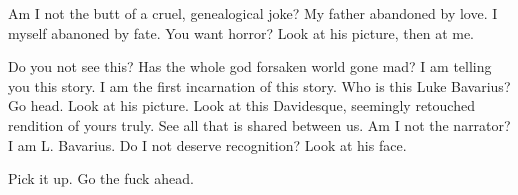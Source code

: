 Am I not the butt of a cruel, genealogical joke? My father
abandoned by love. I myself abanoned by fate. You want horror? Look
at his picture, then at me.

Do you not see this? Has the whole god forsaken world gone mad? I
am telling you this story. I am the first incarnation of this
story. Who is this Luke Bavarius? Go head. Look at his picture.
Look at this Davidesque, seemingly retouched rendition of yours
truly. See all that is shared between us. Am I not the narrator? I
am L. Bavarius. Do I not deserve recognition? Look at his
face.

Pick it up. Go the fuck ahead. 
 






